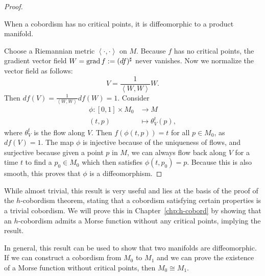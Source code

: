 \begin{proof}
    \begin{marginfigure}
        \centering
        \caption{
            When a cobordism has no critical points, it is diffeomorphic to a product manifold. }
        \label{fig:proof-of-cobordism-without-critical-points}
    \end{marginfigure}
    Choose a Riemannian metric $\left<\cdot ,\cdot  \right>$ on $M$.
    Because  $f$ has no critical points, the gradient vector field $W = \operatorname{grad} f := (df)^{\sharp}$ never vanishes.
    Now we normalize the vector field as follows:
    \[
    V = \frac{1}{\left<W, W \right>} W
    .\] 
    Then $df(V) = \frac{1}{\left<W, W \right>} df(W) = 1$.
    Consider
    \begin{align*}
        \phi: [0, 1] \times M_0&\longrightarrow M \\
        (t, p) &\longmapsto \theta_V^{t}(p)
    ,\end{align*}
    where $\theta_V^{t}$ is the flow along $V$.
    Then $f(\phi(t, p)) = t$ for all $p \in M_0$, as $df(V) = 1$.
    The map $\phi$ is injective because of the uniqueness of flows, and surjective because given a point $p$ in $M$, we can always flow back along $V$ for a time $t$ to find a $p_0 \in M_0$ which then satisfies $\phi(t, p_0) = p$. 
    Because this is also smooth, this proves that $\phi$ is a diffeomorphism.
\end{proof}

\begin{remark}
    While almost trivial, this result is very useful and lies at the basis of the proof of the $h$-cobordism theorem, stating that a cobordism satisfying certain properties is a trivial cobordism.
    We will prove this in Chapter~\ref{chp:h-cobord} by showing that an $h$-cobordism admits a Morse function without any critical points, implying the result.

    In general, this result can be used to show that two manifolds are diffeomorphic. If we can construct a cobordism from $M_0$ to $M_1$ and we can prove the existence of a Morse function without critical points, then $M_0 \cong M_1$.
\end{remark}

